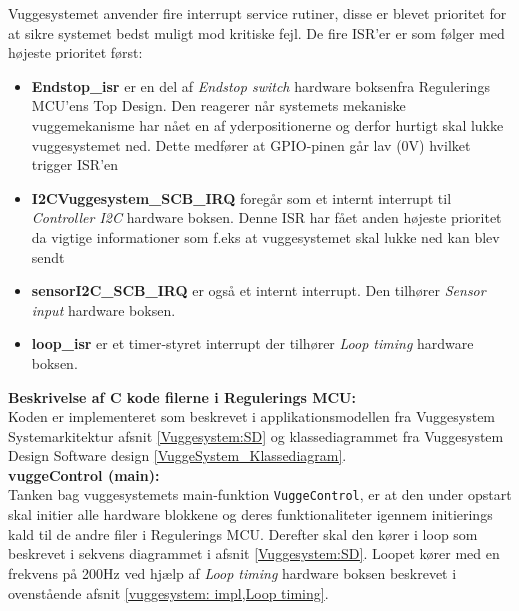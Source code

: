 
Vuggesystemet anvender fire interrupt service rutiner, disse er blevet prioritet for at sikre systemet bedst muligt mod kritiske fejl. De fire ISR'er er som følger med højeste prioritet først:
\begin{itemize}
\item \textbf{Endstop\_isr} er en del af \textit{Endstop switch} hardware boksen\footnotemark  fra Regulerings MCU'ens Top Design. Den reagerer når systemets mekaniske vuggemekanisme har nået en af yderpositionerne og derfor hurtigt skal lukke vuggesystemet ned. Dette medfører at GPIO-pinen går lav (0V) hvilket trigger ISR'en
\item \textbf{I2CVuggesystem\_SCB\_IRQ} foregår som et internt interrupt til \textit{Controller I2C} hardware boksen. Denne ISR har fået anden højeste prioritet da vigtige informationer som f.eks at vuggesystemet skal lukke ned kan blev sendt
\item \textbf{sensorI2C\_SCB\_IRQ} er også et internt interrupt. Den tilhører \textit{Sensor input} hardware boksen. 
\item \textbf{loop\_isr} er et timer-styret interrupt der tilhører \textit{Loop timing} hardware boksen. 
\end{itemize}



\textbf{Beskrivelse af C kode filerne i Regulerings MCU:} \\
Koden er implementeret som beskrevet i applikationsmodellen fra Vuggesystem Systemarkitektur afsnit \vref{Vuggesystem:SD} og klassediagrammet fra Vuggesystem Design Software design \vref{VuggeSystem_Klassediagram}. \\


\textbf{vuggeControl (main):} \\
Tanken bag vuggesystemets main-funktion \verb+VuggeControl+, er at den under opstart skal initier alle hardware blokkene og deres funktionaliteter igennem initierings kald til de andre  filer i Regulerings MCU. Derefter skal den kører i loop som beskrevet i sekvens diagrammet i afsnit \vref{Vuggesystem:SD}. Loopet kører med en frekvens på 200Hz ved hjælp af \textit{Loop timing} hardware boksen beskrevet i ovenstående afsnit \vref{vuggesystem: impl,Loop timing}. \\ 


